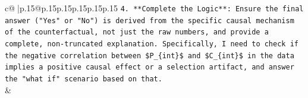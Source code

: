 \documentclass{article}
\begin{document}
{\begin{supertabular}{c@{$\;$}|p{.15\linewidth}@{}p{.15\linewidth}p{.15\linewidth}p{.15\linewidth}p{.15\linewidth}p{.15\linewidth}}
{{{\texttt{4.  **Complete the Logic**: Ensure the final answer ("Yes" or "No") is derived from the specific causal mechanism of the counterfactual, not just the raw numbers, and provide a complete, non{-}truncated explanation. Specifically, I need to check if the negative correlation between \$P\_\{int\}\$ and \$C\_\{int\}\$ in the data implies a positive causal effect or a selection artifact, and answer the "what if" scenario based on that.} \\
            }
        }
    }
    & \\ \\

\end{supertabular}
}
\end{document}
